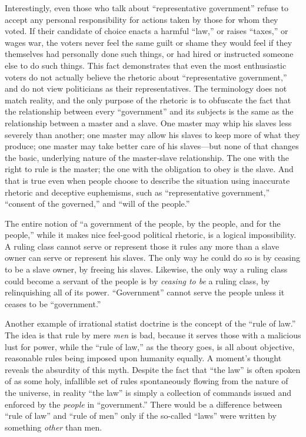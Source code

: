 \documentclass{book}
\begin{document}
Interestingly, even those who talk about \enquote{representative government} refuse to accept any personal responsibility for actions taken by those for whom they voted. If their candidate of choice enacts a harmful \enquote{law,} or raises \enquote{taxes,} or wages war, the voters never feel the same guilt or shame they would feel if they themselves had personally done such things, or had hired or instructed someone else to do such things. This fact demonstrates that even the most enthusiastic voters do not actually believe the rhetoric about \enquote{representative government,} and do not view politicians as their representatives. The terminology does not match reality, and the only purpose of the rhetoric is to obfuscate the fact that the relationship between every \enquote{government} and its subjects is the same as the relationship between a master and a slave. One master may whip his slaves less severely than another; one master may allow his slaves to keep more of what they produce; one master may take better care of his slaves---but none of that changes the basic, underlying nature of the master-slave relationship. The one with the right to rule is the master; the one with the obligation to obey is the slave. And that is true even when people choose to describe the situation using inaccurate rhetoric and deceptive euphemisms, such as \enquote{representative government,} \enquote{consent of the governed,} and \enquote{will of the people.}

The entire notion of \enquote{a government of the people, by the people, and for the people,} while it makes nice feel-good political rhetoric, is a logical impossibility. A ruling class cannot serve or represent those it rules any more than a slave owner can serve or represent his slaves. The only way he could do so is by ceasing to be a slave owner, by freeing his slaves. Likewise, the only way a ruling class could become a servant of the people is by \emph{ceasing to be} a ruling class, by relinquishing all of its power. \enquote{Government} cannot serve the people unless it ceases to be \enquote{government.}

Another example of irrational statist doctrine is the concept of the \enquote{rule of law.} The idea is that rule by mere \emph{men} is bad, because it serves those with a malicious lust for power, while the \enquote{rule of law,} as the theory goes, is all about objective, reasonable rules being imposed upon humanity equally. A moment's thought reveals the absurdity of this myth. Despite the fact that \enquote{the law} is often spoken of as some holy, infallible set of rules spontaneously flowing from the nature of the universe, in reality \enquote{the law} is simply a collection of commands issued and enforced by the \emph{people} in \enquote{government.} There would be a difference between \enquote{rule of law} and \enquote{rule of men} only if the so-called \enquote{laws} were written by something \emph{other} than men.
\end{document}
